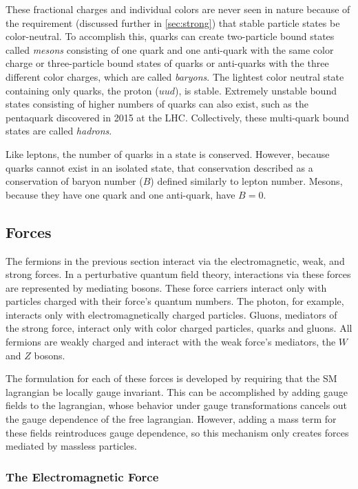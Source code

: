 These fractional charges and individual colors are never seen in nature because of the requirement (discussed further in \autoref{sec:strong}) that stable particle states be color-neutral. To accomplish this, quarks can create two-particle bound states called \textit{mesons} consisting of one quark and one anti-quark with the same color charge or three-particle bound states of quarks or anti-quarks with the three different color charges, which are called \textit{baryons}. The lightest color neutral state containing only quarks, the proton ($uud$), is stable. Extremely unstable bound states consisting of higher numbers of quarks can also exist, such as the pentaquark discovered in 2015 at the \ac{LHC}. \cite{Pentaquark} Collectively, these multi-quark bound states are called \textit{hadrons}. 

Like leptons, the number of quarks in a state is conserved. However, because quarks cannot exist in an isolated state, that conservation described as a conservation of baryon number ($B$) defined similarly to lepton number. Mesons, because they have one quark and one anti-quark, have $B = 0$. 

\subsection{Forces}

The fermions in the previous section interact via the electromagnetic, weak, and strong forces. In a perturbative quantum field theory, interactions via these forces are represented by mediating bosons. These force carriers interact only with particles charged with their  force's quantum numbers. The photon, for example, interacts only with electromagnetically charged particles. Gluons, mediators of the strong force, interact only with color charged particles, quarks and gluons. All fermions are weakly charged and interact with the weak force's mediators, the $W$ and $Z$ bosons. 

The formulation for each of these forces is developed by requiring that the \ac{SM} lagrangian be locally gauge invariant. \cite{Griffiths:111880} This can be accomplished by adding gauge fields to the lagrangian, whose behavior under gauge transformations cancels out the gauge dependence of the free lagrangian. However, adding a mass term for these fields reintroduces gauge dependence, so this mechanism only creates forces mediated by massless particles. 

\subsubsection{The Electromagnetic Force}
\label{sec:em}

